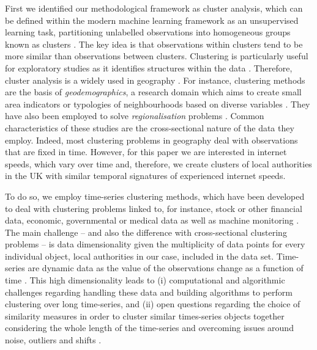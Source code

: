 \documentclass[Royal,times,sageh]{sagej}
\begin{document}
First we identified our methodological framework as cluster analysis,
which can be defined within the modern machine learning framework as an
unsupervised learning task, partitioning unlabelled observations into
homogeneous groups known as clusters \citep{montero2014tsclust}. The key
idea is that observations within clusters tend to be more similar than
observations between clusters. Clustering is particularly useful for
exploratory studies as it identifies structures within the data
\citep{aghabozorgi2015time}. Therefore, cluster analysis is a widely
used in geography \citep{gordon1977classification, everitt1974cluster}.
For instance, clustering methods are the basis of
\emph{geodemographics}, a research domain which aims to create small
area indicators or typologies of neighbourhoods based on diverse
variables \citep{SINGLETON2009289, harris2005geodemographics}. They have
also been employed to solve \emph{regionalisation} problems
\citep{niesterowicz2016}. Common characteristics of these studies are
the cross-sectional nature of the data they employ. Indeed, most
clustering problems in geography deal with observations that are fixed
in time. However, for this paper we are interested in internet speeds,
which vary over time and, therefore, we create clusters of local
authorities in the UK with similar temporal signatures of experienced
internet speeds.

To do so, we employ time-series clustering methods, which have been
developed to deal with clustering problems linked to, for instance,
stock or other financial data, economic, governmental or medical data as
well as machine monitoring
\citep{aggarwal2013time, aggarwal2001surprising, hyndman2015large, WARRENLIAO20051857}.
The main challenge -- and also the difference with cross-sectional
clustering problems -- is data dimensionality given the multiplicity of
data points for every individual object, local authorities in our case,
included in the data set. Time-series are dynamic data as the value of
the observations change as a function of time
\citep{aghabozorgi2015time}. This high dimensionality leads to (i)
computational and algorithmic challenges regarding handling these data
and building algorithms to perform clustering over long time-series, and
(ii) open questions regarding the choice of similarity measures in order
to cluster similar times-series objects together considering the whole
length of the time-series and overcoming issues around noise, outliers
and shifts \citep{lin2004iterative, aghabozorgi2015time}.
\end{document}
